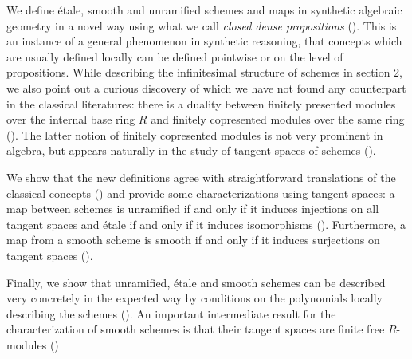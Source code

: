 We define étale, smooth and unramified schemes and maps in synthetic algebraic geometry in a novel way using what we call \emph{closed dense propositions} ().
This is an instance of a general phenomenon in synthetic reasoning, that concepts which are usually defined locally can be defined pointwise or on the level of propositions.
While describing the infinitesimal structure of schemes in section 2, we also point out a curious discovery of which we have not found any counterpart in the classical literatures: there is a duality between finitely presented modules over the internal base ring $R$ and finitely copresented modules over the same ring ().
The latter notion of finitely copresented modules is not very prominent in algebra, but appears naturally in the study of tangent spaces of schemes ().

We show that the new definitions agree with straightforward translations of the classical concepts () and provide some characterizations using tangent spaces:
a map between schemes is unramified if and only if it induces injections on all tangent spaces and étale if and only if it induces isomorphisms (). Furthermore, a map from a smooth scheme is smooth if and only if it induces surjections on tangent spaces ().

Finally, we show that unramified, étale and smooth schemes can be described very concretely in the expected way by conditions on the polynomials locally describing the schemes (). An important intermediate result for the characterization of smooth schemes is that their tangent spaces are finite free $R$-modules ()
